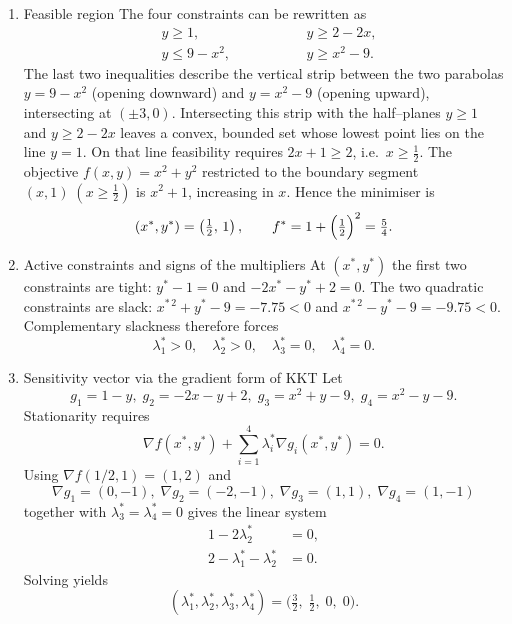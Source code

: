 \documentclass{article}
\begin{document}
\begin{enumerate}
\item  Feasible region  
      The four constraints can be rewritten as  
      \[
      \begin{aligned}
      &y\ge 1, \qquad\qquad\qquad
      &&y\ge 2-2x,\\
      &y\le 9-x^{2},\qquad
      &&y\ge x^{2}-9.
      \end{aligned}
      \] 
      The last two inequalities describe the vertical strip between the two parabolas
      \(y=9-x^{2}\) (opening downward) and \(y=x^{2}-9\) (opening upward), intersecting at
      \((\pm 3,0)\).
      Intersecting this strip with the half–planes \(y\ge 1\) and
      \(y\ge 2-2x\) leaves a convex, bounded set whose lowest point lies on
      the line \(y=1\).  
      On that line feasibility requires \(2x+1\ge 2\), i.e.\ \(x\ge \tfrac12\).
      The objective \(f(x,y)=x^{2}+y^{2}\) restricted to the boundary segment
      \((x,1)\;(x\ge\tfrac12)\) is \(x^{2}+1\), increasing in \(x\).
      Hence the minimiser is  
      \[
      (x^{*},y^{*})=\left(\tfrac12,\,1\right), \qquad f^{*}=1+\Bigl(\tfrac12\Bigr)^{2}= \tfrac54 .
      \]

\item  Active constraints and signs of the multipliers  
      At \((x^{*},y^{*})\) the first two constraints are tight:
      \(y^{*}-1=0\) and \(-2x^{*}-y^{*}+2=0\).
      The two quadratic constraints are slack:
      \(x^{*\,2}+y^{*}-9=-7.75<0\) and \(x^{*\,2}-y^{*}-9=-9.75<0\).
      Complementary slackness therefore forces  
      \[
      \lambda_{1}^{*}>0,\quad\lambda_{2}^{*}>0,\quad
      \lambda_{3}^{*}=0,\quad\lambda_{4}^{*}=0 .
      \]

\item  Sensitivity vector via the gradient form of KKT  
      Let 
      \[
      g_{1}=1-y,\;
      g_{2}=-2x-y+2,\;
      g_{3}=x^{2}+y-9,\;
      g_{4}=x^{2}-y-9 .
      \]
      Stationarity requires  
      \[
      \nabla f(x^{*},y^{*})+\sum_{i=1}^{4}\lambda_{i}^{*}\nabla g_{i}(x^{*},y^{*})=0 .
      \]
      Using \(\nabla f(1/2,1)=(1,2)\) and  
      \[
      \nabla g_{1}=(0,-1),\;
      \nabla g_{2}=(-2,-1),\;
      \nabla g_{3}=(1,1),\;
      \nabla g_{4}=(1,-1)
      \]
      together with \(\lambda_{3}^{*}=\lambda_{4}^{*}=0\) gives the linear system
      \[
      \begin{aligned}
      1-2\lambda_{2}^{*} &=0,\\
      2-\lambda_{1}^{*}-\lambda_{2}^{*} &=0 .
      \end{aligned}
      \]
      Solving yields  
      \[
      (\lambda_{1}^{*},\lambda_{2}^{*},\lambda_{3}^{*},\lambda_{4}^{*})
      =\bigl(\tfrac32,\;\tfrac12,\;0,\;0\bigr).
      \]


\end{enumerate}
\end{document}
